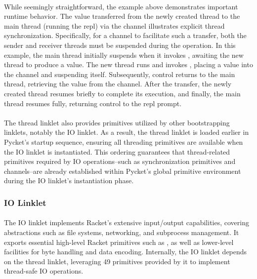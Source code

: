 				\paragraph{}%
					While seemingly straightforward, the example above demonstrates important runtime behavior. The value transferred from the newly created thread to the main thread (running the \gls{repl}) via the channel illustrates explicit thread synchronization. Specifically, for a channel to facilitate such a transfer, both the sender and receiver threads must be suspended during the operation. In this example, the main thread initially suspends when it invokes , awaiting the new thread to produce a value. The new thread runs and invokes , placing a value into the channel and suspending itself. Subsequently, control returns to the main thread, retrieving the value from the channel. After the transfer, the newly created thread resumes briefly to complete its execution, and finally, the main thread resumes fully, returning control to the \gls{repl} prompt.

				\paragraph{}%
					The thread linklet also provides primitives utilized by other bootstrapping linklets, notably the IO linklet. As a result, the thread linklet is loaded earlier in Pycket's startup sequence, ensuring all threading primitives are available when the IO linklet is instantiated. This ordering guarantees that thread-related primitives required by IO operations--such as synchronization primitives and channels--are already established within Pycket's global primitive environment during the IO linklet's instantiation phase.

			\subsubsection{IO Linklet}

				\paragraph{}%
					The IO linklet implements Racket's extensive input/output capabilities, covering abstractions such as file systems, networking, and subprocess management. It exports essential high-level Racket primitives such as , as well as lower-level facilities for byte handling and data encoding. Internally, the IO linklet depends on the thread linklet, leveraging 49 primitives provided by it to implement thread-safe IO operations.


